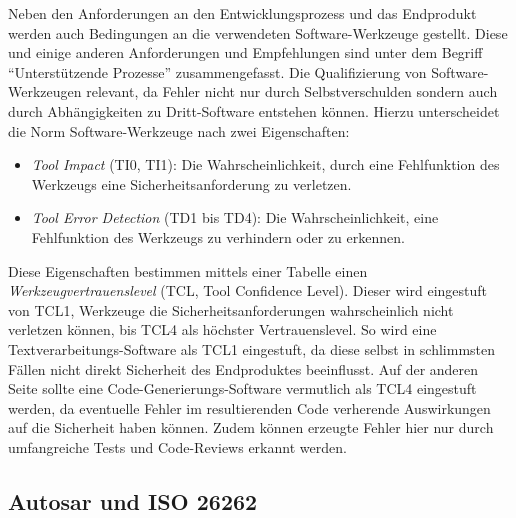 \documentclass[
  a4paper,					    %
  twoside,
  DIV=calc,     				%
  bibliography=totoc,
  cleardoublepage=empty,
  ngerman,     					%
  final       					%
]{scrbook}
\begin{document}
Neben den Anforderungen an den Entwicklungsprozess und das Endprodukt werden auch Bedingungen an die verwendeten Software-Werkzeuge gestellt. Diese und einige anderen Anforderungen und Empfehlungen sind unter dem Begriff "`Unterstützende Prozesse"' zusammengefasst. Die Qualifizierung von Software-Werkzeugen relevant, da Fehler nicht nur durch Selbstverschulden sondern auch durch Abhängigkeiten zu Dritt-Software entstehen können. Hierzu unterscheidet die Norm Software-Werkzeuge nach zwei Eigenschaften:

\begin{itemize}
    \item \emph{Tool Impact} (TI0, TI1): Die Wahrscheinlichkeit, durch eine Fehlfunktion des Werkzeugs eine Sicherheitsanforderung zu verletzen.
    \item \emph{Tool Error Detection} (TD1 bis TD4): Die Wahrscheinlichkeit, eine Fehlfunktion des Werkzeugs zu verhindern oder zu erkennen.
\end{itemize}

Diese Eigenschaften bestimmen mittels einer Tabelle einen \emph{Werkzeugvertrauenslevel} (TCL, Tool Confidence Level). Dieser wird eingestuft von TCL1, Werkzeuge die Sicherheitsanforderungen wahrscheinlich nicht verletzen können, bis TCL4 als höchster Vertrauenslevel. So wird eine Textverarbeitungs-Software als TCL1 eingestuft, da diese selbst in schlimmsten Fällen nicht direkt Sicherheit des Endproduktes beeinflusst. Auf der anderen Seite sollte eine Code-Generierungs-Software vermutlich als TCL4 eingestuft werden, da eventuelle Fehler im resultierenden Code verherende Auswirkungen auf die Sicherheit haben können. Zudem können erzeugte Fehler hier nur durch umfangreiche Tests und Code-Reviews erkannt werden.




\subsection{Autosar und ISO 26262}
\label{sec:ISO26262_autosar}
\end{document}
